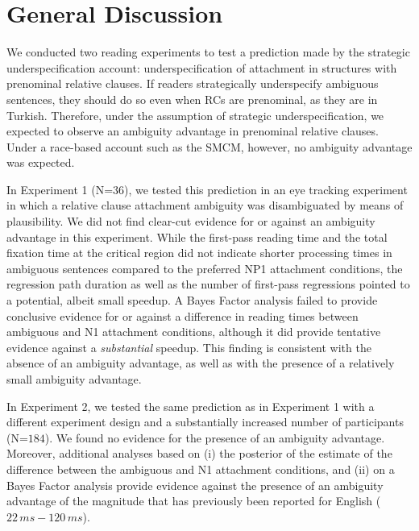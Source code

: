 \documentclass[english, doc]{apa7}\usepackage[]{graphicx}\usepackage[]{color}
\begin{document}
\section{General Discussion}

We conducted two reading experiments to test a prediction made by the strategic underspecification account: underspecification of attachment in structures with prenominal relative clauses.
If readers strategically underspecify ambiguous sentences, they should do so even when RCs are prenominal, as they are in Turkish. Therefore, under the assumption of strategic underspecification, we expected to observe an ambiguity advantage in prenominal relative clauses. Under a race-based account such as the SMCM, however, no ambiguity advantage was expected.

In Experiment 1 (N=$36$), we tested this prediction in an eye tracking experiment in which a relative clause attachment ambiguity was disambiguated by means of plausibility. We did not find clear-cut evidence for or against an ambiguity advantage in this experiment. While the first-pass reading time and the total fixation time at the critical region did not indicate shorter processing times in ambiguous sentences compared to the preferred NP1 attachment conditions, the regression path duration as well as the number of first-pass regressions pointed to a potential, albeit small speedup. 
A Bayes Factor analysis failed to provide conclusive evidence for or against a difference in reading times between ambiguous and N1 attachment conditions, although it did provide tentative evidence against a \textit{substantial} speedup. 
This finding is consistent with the absence of an ambiguity advantage, as well as with the presence of a relatively small ambiguity advantage.

In Experiment 2, we tested the same prediction as in Experiment 1 with a different experiment design and a substantially increased number of participants (N=$184$). We found no evidence for the presence of an ambiguity advantage. Moreover, additional analyses based on (i) the posterior of the estimate of the difference between the ambiguous and N1 attachment conditions, and (ii) on a Bayes Factor analysis provide evidence against the presence of an ambiguity advantage of the magnitude that has previously been reported for English ($22\,ms-120\,ms$).
\end{document}
